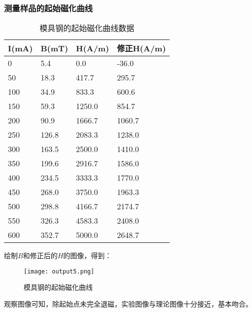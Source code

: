 \documentclass[UTF-8,twoside,cs4size]{ctexart}
\begin{document}
\subsubsection{测量样品的起始磁化曲线}
\begin{table}[!h]
    \centering
    \caption{模具钢的起始磁化曲线数据}
    \begin{tabular}{|l|l|l|l|}
    \hline
        I(mA) & B(mT) & H(A/m) & 修正H(A/m) \\ \hline
        0 & 5.4 & 0.0  & -36.0  \\ \hline
        50 & 18.3 & 417.7  & 295.7  \\ \hline
        100 & 34.9 & 833.3  & 600.6  \\ \hline
        150 & 59.3 & 1250.0  & 854.7  \\ \hline
        200 & 90.9 & 1666.7  & 1060.7  \\ \hline
        250 & 126.8 & 2083.3  & 1238.0  \\ \hline
        300 & 163.5 & 2500.0  & 1410.0  \\ \hline
        350 & 199.6 & 2916.7  & 1586.0  \\ \hline
        400 & 234.5 & 3333.3  & 1770.0  \\ \hline
        450 & 268.0 & 3750.0  & 1963.3  \\ \hline
        500 & 298.8 & 4166.7  & 2174.7 \\ \hline
        550 & 326.3 & 4583.3  & 2408.0 \\ \hline
        600 & 352.7 & 5000.0  & 2648.7 \\ \hline
    \end{tabular}
\end{table}
绘制$B$和修正后的$H$的图像，得到：
\newpage
\begin{figure}[!h]
    \centering
    \texttt{[image: output5.png]}
    \caption{模具钢的起始磁化曲线}
\end{figure}

观察图像可知，除起始点未完全退磁，实验图像与理论图像十分接近，基本吻合。
\newpage
\end{document}
